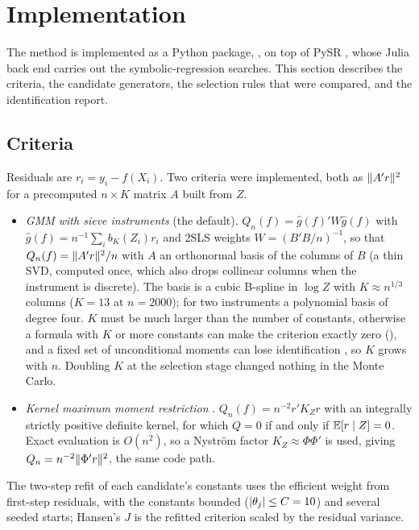 \section{Implementation}
\label{sec:impl}

The method is implemented as a Python package, , on top of PySR \citep{cranmer2023}, whose Julia back end carries out the symbolic-regression searches. This section describes the criteria, the candidate generators, the selection rules that were compared, and the identification report.

\subsection{Criteria}
\label{sec:impl-criteria}

Residuals are $r_i = y_i - f(X_i)$. Two criteria were implemented, both as $\lVert A'r\rVert^2$ for a precomputed $n \times K$ matrix $A$ built from $Z$.
\begin{itemize}
\item \emph{GMM with sieve instruments} (the default). $Q_n(f) = \hat g(f)'W\hat g(f)$ with $\hat g(f) = n^{-1}\sum_ib_K(Z_i)r_i$ and 2SLS weights $W = (B'B/n)^{-1}$, so that $Q_n(f) = \lVert A'r\rVert^2/n$ with $A$ an orthonormal basis of the columns of $B$ (a thin SVD, computed once, which also drops collinear columns when the instrument is discrete). The basis is a cubic B-spline in $\log Z$ with $K \approx n^{1/3}$ columns ($K = 13$ at $n = 2000$); for two instruments a polynomial basis of degree four. $K$ must be much larger than the number of constants, otherwise a formula with $K$ or more constants can make the criterion exactly zero (), and a fixed set of unconditional moments can lose identification \citep{dominguezlobato2004}, so $K$ grows with $n$. Doubling $K$ at the selection stage changed nothing in the Monte Carlo.
\item \emph{Kernel maximum moment restriction} \citep{zhang2020}. $Q_n(f) = n^{-2}r'K_Zr$ with an integrally strictly positive definite kernel, for which $Q = 0$ if and only if $\mathbb{E}[r \mid Z] = 0$. Exact evaluation is $O(n^2)$, so a Nystr\"om factor $K_Z \approx \Phi\Phi'$ is used, giving $Q_n = n^{-2}\lVert \Phi'r\rVert^2$, the same code path.
\end{itemize}
The two-step refit of each candidate's constants uses the efficient weight from first-step residuals, with the constants bounded ($\lvert \theta_j\rvert \le C = 10$) and several seeded starts; Hansen's $J$ is the refitted criterion scaled by the residual variance.

